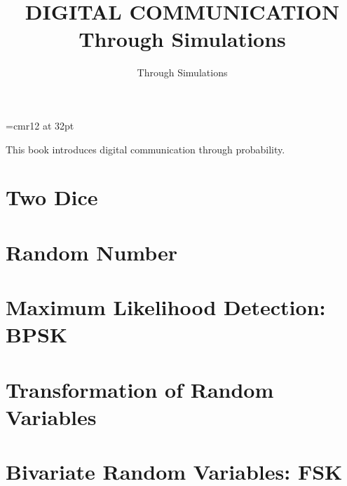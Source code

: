 \documentclass[12pt]{book}
\begin{document}
\font\myfont=cmr12 at 32pt

\frontmatter


\subtitle{Through Simulations}


\title{\myfont DIGITAL COMMUNICATION}
\title{ }
\bigskip

\title{\myfont Through Simulations}

\tableofcontents



\setcounter{page}{1}

\begin{introduction}
This book introduces digital communication through probability.

\end{introduction}

\mainmatter

\chapter{Two Dice}


\chapter{Random Number}


\chapter{Maximum Likelihood Detection: BPSK}


\chapter{Transformation of Random Variables}


\chapter{Bivariate Random Variables: FSK}


\backmatter
\appendix

\latexprintindex
\end{document}
